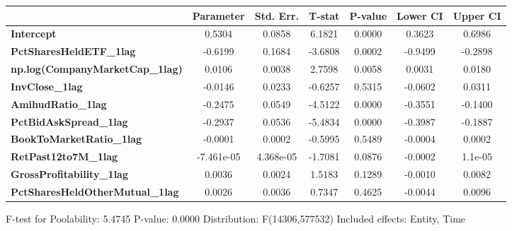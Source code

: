 \begin{center}
\begin{tabular}{lclc}
\bottomrule
\end{tabular}
\begin{tabular}{lcccccc}
                                        & \textbf{Parameter} & \textbf{Std. Err.} & \textbf{T-stat} & \textbf{P-value} & \textbf{Lower CI} & \textbf{Upper CI}  \\
\midrule
\textbf{Intercept}                      &       0.5304       &       0.0858       &      6.1821     &      0.0000      &       0.3623      &       0.6986       \\
\textbf{PctSharesHeldETF\_1lag}         &      -0.6199       &       0.1684       &     -3.6808     &      0.0002      &      -0.9499      &      -0.2898       \\
\textbf{np.log(CompanyMarketCap\_1lag)} &       0.0106       &       0.0038       &      2.7598     &      0.0058      &       0.0031      &       0.0180       \\
\textbf{InvClose\_1lag}                 &      -0.0146       &       0.0233       &     -0.6257     &      0.5315      &      -0.0602      &       0.0311       \\
\textbf{AmihudRatio\_1lag}              &      -0.2475       &       0.0549       &     -4.5122     &      0.0000      &      -0.3551      &      -0.1400       \\
\textbf{PctBidAskSpread\_1lag}          &      -0.2937       &       0.0536       &     -5.4834     &      0.0000      &      -0.3987      &      -0.1887       \\
\textbf{BookToMarketRatio\_1lag}        &      -0.0001       &       0.0002       &     -0.5995     &      0.5489      &      -0.0004      &       0.0002       \\
\textbf{RetPast12to7M\_1lag}            &     -7.461e-05     &     4.368e-05      &     -1.7081     &      0.0876      &      -0.0002      &       1.1e-05      \\
\textbf{GrossProfitability\_1lag}       &       0.0036       &       0.0024       &      1.5183     &      0.1289      &      -0.0010      &       0.0082       \\
\textbf{PctSharesHeldOtherMutual\_1lag} &       0.0026       &       0.0036       &      0.7347     &      0.4625      &      -0.0044      &       0.0096       \\
\bottomrule
\end{tabular}
\end{center}

F-test for Poolability: 5.4745 \newline
 P-value: 0.0000 \newline
 Distribution: F(14306,577532) \newline
  \newline
 Included effects: Entity, Time